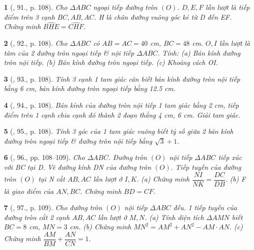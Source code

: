 \documentclass{article}
\newtheorem{baitoan}{}
\begin{document}
\begin{baitoan}[\cite{Binh_Toan_9_tap_1}, 91., p. 108]
	Cho $\Delta ABC$ ngoại tiếp đường tròn $(O)$. $D,E,F$ lần lượt là tiếp điểm trên 3 cạnh $BC,AB,AC$. H là chân đường vuông góc kẻ từ D đến EF. Chứng minh $\widehat{BHE} = \widehat{CHF}$.
\end{baitoan}

\begin{baitoan}[\cite{Binh_Toan_9_tap_1}, 92., p. 108]
	Cho $\Delta ABC$ có $AB = AC = 40$ {\rm cm}, $BC = 48$ {\rm cm}. $O,I$ lần lượt là tâm của 2 đường tròn ngoại tiếp \& nội tiếp $\Delta ABC$. Tính: (a) Bán kính đường tròn nội tiếp. (b) Bán kính đường tròn ngoại tiếp. (c) Khoảng cách OI.
\end{baitoan}

\begin{baitoan}[\cite{Binh_Toan_9_tap_1}, 93., p. 108]
	Tính 3 cạnh 1 tam giác cân biết bán kính đường tròn nội tiếp bằng {\rm6 cm}, bán kính đường tròn ngoại tiếp bằng {\rm12.5 cm}.
\end{baitoan}

\begin{baitoan}[\cite{Binh_Toan_9_tap_1}, 94., p. 108]
	Bán kính của đường tròn nội tiếp 1 tam giác bằng {\rm2 cm}, tiếp điểm trên 1 cạnh chia cạnh đó thành 2 đoạn thẳng {\rm4 cm, 6 cm}. Giải tam giác.
\end{baitoan}

\begin{baitoan}[\cite{Binh_Toan_9_tap_1}, 95., p. 108]
	Tính 3 góc của 1 tam giác vuông biết tỷ số giữa 2 bán kính đường tròn ngoại tiếp \& đường tròn nội tiếp bằng $\sqrt{3} + 1$.
\end{baitoan}

\begin{baitoan}[\cite{Binh_Toan_9_tap_1}, 96., pp. 108--109]
	Cho $\Delta ABC$. Đường tròn $(O)$ nội tiếp $\Delta ABC$ tiếp xúc với BC tại D. Vẽ đường kính DN của đường tròn $(O)$. Tiếp tuyến của đường tròn $(O)$ tại N cắt $AB,AC$ lần lượt ở $I,K$. (a) Chứng minh $\dfrac{NI}{NK} = \dfrac{DC}{DB}$. (b) F là giao điểm của $AN,BC$. Chứng minh $BD = CF$.
\end{baitoan}

\begin{baitoan}[\cite{Binh_Toan_9_tap_1}, 97., p. 109]
	Cho đường tròn $(O)$ nội tiếp $\Delta ABC$ đều. 1 tiếp tuyến của đường tròn cắt 2 cạnh $AB,AC$ lần lượt ở $M,N$. (a) Tính diện tích $\Delta AMN$ biết $BC = 8$ {\rm cm}, $MN = 3$ {\rm cm}. (b) Chứng minh $MN^2 = AM^2 + AN^2 - AM\cdot AN$. (c) Chứng minh $\dfrac{AM}{BM} + \dfrac{AN}{CN} = 1$.
\end{baitoan}
\end{document}
